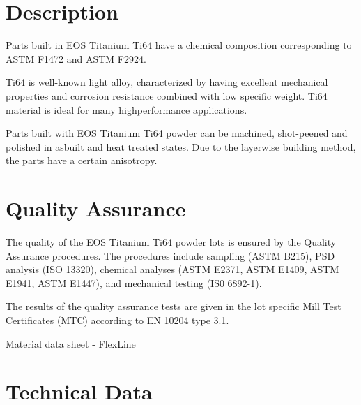 \documentclass[10pt]{article}
\begin{document}
\section*{Description}
Parts built in EOS Titanium Ti64 have a chemical composition corresponding to ASTM F1472 and ASTM F2924.

Ti64 is well-known light alloy, characterized by having excellent mechanical properties and corrosion resistance combined with low specific weight. Ti64 material is ideal for many highperformance applications.

Parts built with EOS Titanium Ti64 powder can be machined, shot-peened and polished in asbuilt and heat treated states. Due to the layerwise building method, the parts have a certain anisotropy.

\section*{Quality Assurance}
The quality of the EOS Titanium Ti64 powder lots is ensured by the Quality Assurance procedures. The procedures include sampling (ASTM B215), PSD analysis (ISO 13320), chemical analyses (ASTM E2371, ASTM E1409, ASTM E1941, ASTM E1447), and mechanical testing (IS0 6892-1).

The results of the quality assurance tests are given in the lot specific Mill Test Certificates (MTC) according to EN 10204 type 3.1.

Material data sheet - FlexLine

\section*{Technical Data}
\end{document}
